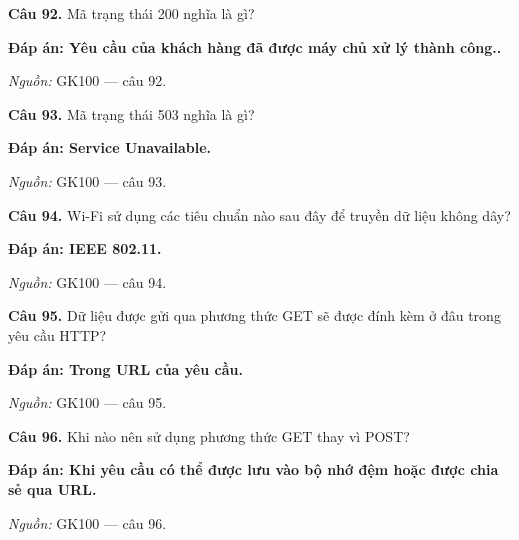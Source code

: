 \documentclass[11pt,a4paper]{article}
\begin{document}
\textbf{Câu 92.} Mã trạng thái 200 nghĩa là gì?\par
{\color{answer}\textbf{Đáp án: Yêu cầu của khách hàng đã được máy chủ xử lý thành công..}}\par
{\footnotesize\color{sourcegray}\textit{Nguồn:} GK100 — câu 92.\par}
\vspace{3pt}\par\noindent{\color{black!18}\rule{\linewidth}{0.3pt}}\par\medskip

\textbf{Câu 93.} Mã trạng thái 503 nghĩa là gì?\par
{\color{answer}\textbf{Đáp án: Service Unavailable.}}\par
{\footnotesize\color{sourcegray}\textit{Nguồn:} GK100 — câu 93.\par}
\vspace{3pt}\par\noindent{\color{black!18}\rule{\linewidth}{0.3pt}}\par\medskip

\textbf{Câu 94.} Wi-Fi sử dụng các tiêu chuẩn nào sau đây để truyền dữ liệu không dây?\par
{\color{answer}\textbf{Đáp án: IEEE 802.11.}}\par
{\footnotesize\color{sourcegray}\textit{Nguồn:} GK100 — câu 94.\par}
\vspace{3pt}\par\noindent{\color{black!18}\rule{\linewidth}{0.3pt}}\par\medskip

\textbf{Câu 95.} Dữ liệu được gửi qua phương thức GET sẽ được đính kèm ở đâu trong yêu cầu HTTP?\par
{\color{answer}\textbf{Đáp án: Trong URL của yêu cầu.}}\par
{\footnotesize\color{sourcegray}\textit{Nguồn:} GK100 — câu 95.\par}
\vspace{3pt}\par\noindent{\color{black!18}\rule{\linewidth}{0.3pt}}\par\medskip

\textbf{Câu 96.} Khi nào nên sử dụng phương thức GET thay vì POST?\par
{\color{answer}\textbf{Đáp án: Khi yêu cầu có thể được lưu vào bộ nhớ đệm hoặc được chia sẻ qua URL.}}\par
{\footnotesize\color{sourcegray}\textit{Nguồn:} GK100 — câu 96.\par}
\vspace{3pt}\par\noindent{\color{black!18}\rule{\linewidth}{0.3pt}}\par\medskip
\end{document}

